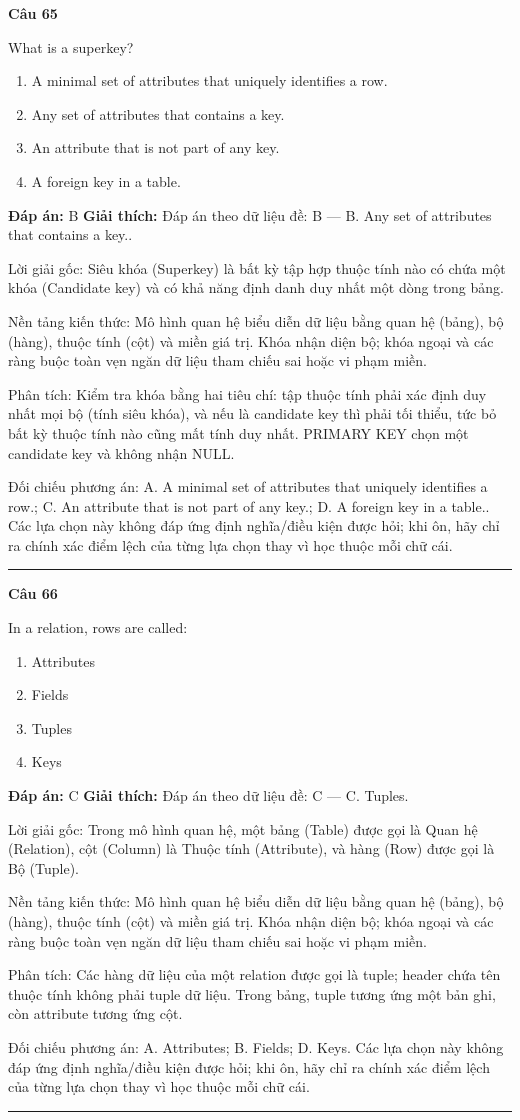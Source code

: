 \documentclass[11pt,a4paper]{article}
\newenvironment{question}[1]{%
  \par\vspace{1em}\noindent\textbf{\large Câu #1}\par\vspace{0.4em}
}{%
  \par\vspace{1em}\hrule\vspace{0.6em}
}
\newenvironment{choices}{%
  \begin{enumerate}[label=\textbf{\Alph*.},leftmargin=2.2em,itemsep=2pt,topsep=3pt]
}{%
  \end{enumerate}
}
\newcommand{\choice}{\item}
\begin{document}
\begin{question}{65}
What is a superkey?
\begin{choices}
\choice A minimal set of attributes that uniquely identifies a row.
\choice Any set of attributes that contains a key.
\choice An attribute that is not part of any key.
\choice A foreign key in a table.
\end{choices}
\textbf{Đáp án:} B
\textbf{Giải thích:} Đáp án theo dữ liệu đề: B — B. Any set of attributes that contains a key..

Lời giải gốc: Siêu khóa (Superkey) là bất kỳ tập hợp thuộc tính nào có chứa một khóa (Candidate key) và có khả năng định danh duy nhất một dòng trong bảng.

Nền tảng kiến thức: Mô hình quan hệ biểu diễn dữ liệu bằng quan hệ (bảng), bộ (hàng), thuộc tính (cột) và miền giá trị. Khóa nhận diện bộ; khóa ngoại và các ràng buộc toàn vẹn ngăn dữ liệu tham chiếu sai hoặc vi phạm miền.

Phân tích: Kiểm tra khóa bằng hai tiêu chí: tập thuộc tính phải xác định duy nhất mọi bộ (tính siêu khóa), và nếu là candidate key thì phải tối thiểu, tức bỏ bất kỳ thuộc tính nào cũng mất tính duy nhất. PRIMARY KEY chọn một candidate key và không nhận NULL.

Đối chiếu phương án: A. A minimal set of attributes that uniquely identifies a row.; C. An attribute that is not part of any key.; D. A foreign key in a table.. Các lựa chọn này không đáp ứng định nghĩa/điều kiện được hỏi; khi ôn, hãy chỉ ra chính xác điểm lệch của từng lựa chọn thay vì học thuộc mỗi chữ cái.
\end{question}

\begin{question}{66}
In a relation, rows are called:
\begin{choices}
\choice Attributes
\choice Fields
\choice Tuples
\choice Keys
\end{choices}
\textbf{Đáp án:} C
\textbf{Giải thích:} Đáp án theo dữ liệu đề: C — C. Tuples.

Lời giải gốc: Trong mô hình quan hệ, một bảng (Table) được gọi là Quan hệ (Relation), cột (Column) là Thuộc tính (Attribute), và hàng (Row) được gọi là Bộ (Tuple).

Nền tảng kiến thức: Mô hình quan hệ biểu diễn dữ liệu bằng quan hệ (bảng), bộ (hàng), thuộc tính (cột) và miền giá trị. Khóa nhận diện bộ; khóa ngoại và các ràng buộc toàn vẹn ngăn dữ liệu tham chiếu sai hoặc vi phạm miền.

Phân tích: Các hàng dữ liệu của một relation được gọi là tuple; header chứa tên thuộc tính không phải tuple dữ liệu. Trong bảng, tuple tương ứng một bản ghi, còn attribute tương ứng cột.

Đối chiếu phương án: A. Attributes; B. Fields; D. Keys. Các lựa chọn này không đáp ứng định nghĩa/điều kiện được hỏi; khi ôn, hãy chỉ ra chính xác điểm lệch của từng lựa chọn thay vì học thuộc mỗi chữ cái.
\end{question}
\end{document}
